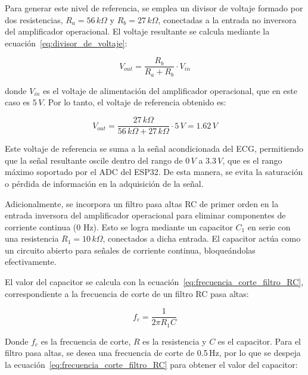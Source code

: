        Para generar este nivel de referencia, se emplea un divisor de voltaje formado por dos resistencias, $R_a = 56\,k\Omega$ y $R_b = 27\,k\Omega$, conectadas a la entrada no inversora del amplificador operacional. El voltaje resultante se calcula mediante la ecuación~\ref{eq:divisor_de_voltaje}:

        \begin{equation}
            \label{eq:divisor_de_voltaje}
            V_{out} = \frac{R_b}{R_a + R_b} \cdot V_{in}
        \end{equation}

        donde $V_{in}$ es el voltaje de alimentación del amplificador operacional, que en este caso es $5\,V$. Por lo tanto, el voltaje de referencia obtenido es:

        \begin{equation}
            \label{eq:voltaje_divisorECG}
            V_{out} = \frac{27\,k\Omega}{56\,k\Omega + 27\,k\Omega} \cdot 5\,V = 1.62\,V
        \end{equation}

        Este voltaje de referencia se suma a la señal acondicionada del ECG, permitiendo que la señal resultante oscile dentro del rango de $0\,V$ a $3.3\,V$, que es el rango máximo soportado por el ADC del ESP32. De esta manera, se evita la saturación o pérdida de información en la adquisición de la señal.

        Adicionalmente, se incorpora un filtro pasa altas RC de primer orden en la entrada inversora del amplificador operacional para eliminar componentes de corriente continua (0 Hz). Esto se logra mediante un capacitor $C_1$ en serie con una resistencia $R_1 = 10\,k\Omega$, conectados a dicha entrada. El capacitor actúa como un circuito abierto para señales de corriente continua, bloqueándolas efectivamente.

        El valor del capacitor se calcula con la ecuación~\ref{eq:frecuencia_corte_filtro_RC}, correspondiente a la frecuencia de corte de un filtro RC pasa altas:

        \begin{equation}
            \label{eq:frecuencia_corte_filtro_RC}
            f_c = \frac{1}{2\pi R_1 C}
        \end{equation}

        Donde $f_c$ es la frecuencia de corte, $R$ es la resistencia y $C$ es el capacitor. Para el filtro pasa altas, se desea una frecuencia de corte de 0.5\,Hz, por lo que se despeja la ecuación~\ref{eq:frecuencia_corte_filtro_RC} para obtener el valor del capacitor:

